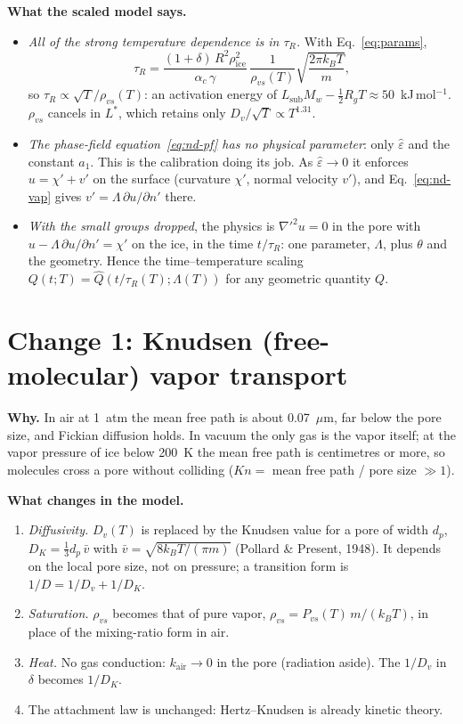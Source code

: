 \documentclass[11pt]{article}
\newcommand{\ice}{\mathrm{ice}}
\newcommand{\air}{\mathrm{air}}
\newcommand{\rvs}{\rho_{vs}}
\newcommand{\eh}{\hat\varepsilon}
\begin{document}
\textbf{What the scaled model says.}
\begin{itemize}
\item \emph{All of the strong temperature dependence is in $\tau_{R}$.} With
  Eq.~\eqref{eq:params},
  \[
  \tau_{R} = \frac{(1+\delta)\,R^{2}\rho_\ice^{2}}{\alpha_c\,\gamma}\,\frac{1}{\rvs(T)}\sqrt{\frac{2\pi k_BT}{m}} ,
  \]
  so $\tau_{R} \propto \sqrt T/\rvs(T)$: an activation energy of
  $L_{\mathrm{sub}}M_w - \tfrac12R_gT \approx 50$~kJ\,mol$^{-1}$. $\rvs$ cancels in $L^{*}$, which
  retains only $D_v/\sqrt T \propto T^{1.31}$.
\item \emph{The phase-field equation~\eqref{eq:nd-pf} has no physical
  parameter}: only $\eh$ and the constant $a_1$. This is the calibration
  doing its job. As $\eh \to 0$ it enforces $u = \chi' + v'$ on the surface
  (curvature $\chi'$, normal velocity $v'$), and Eq.~\eqref{eq:nd-vap} gives
  $v' = \Lambda\,\partial u/\partial n'$ there.
\item \emph{With the small groups dropped}, the physics is $\nabla'^{2}u =
  0$ in the pore with $u - \Lambda\,\partial u/\partial n' = \chi'$ on the
  ice, in the time $t/\tau_{R}$: one parameter, $\Lambda$, plus $\theta$ and the
  geometry. Hence the time--temperature scaling $Q(t;T) = \widehat
  Q(t/\tau_{R}(T);\Lambda(T))$ for any geometric quantity $Q$.
\end{itemize}

\section{Change 1: Knudsen (free-molecular) vapor transport}

\textbf{Why.} In air at 1~atm the mean free path is about 0.07~$\mu$m, far
below the pore size, and Fickian diffusion holds. In vacuum the only gas is
the vapor itself; at the vapor pressure of ice below 200~K the mean free path
is centimetres or more, so molecules cross a pore without colliding ($Kn =$
mean free path / pore size $\gg 1$).

\textbf{What changes in the model.}
\begin{enumerate}
\item \emph{Diffusivity.} $D_v(T)$ is replaced by the Knudsen value for a
  pore of width $d_p$, $D_K = \tfrac13 d_p\,\bar v$ with $\bar v =
  \sqrt{8k_BT/(\pi m)}$ (Pollard \& Present, 1948). It depends on the local
  pore size, not on pressure; a transition form is $1/D = 1/D_v + 1/D_K$.
\item \emph{Saturation.} $\rvs$ becomes that of pure vapor, $\rvs =
  P_{vs}(T)\,m/(k_BT)$, in place of the mixing-ratio form in air.
\item \emph{Heat.} No gas conduction: $k_\air \to 0$ in the pore (radiation
  aside). The $1/D_v$ in $\delta$ becomes $1/D_K$.
\item The attachment law is unchanged: Hertz--Knudsen is already kinetic
  theory.
\end{enumerate}
\end{document}
